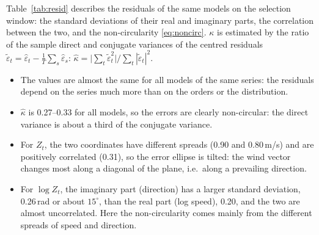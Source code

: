 \documentclass[11pt,a4paper]{article}
\begin{document}
Table~\ref{tab:resid} describes the residuals of the same models on the selection window: the
standard deviations of their real and imaginary parts, the correlation between the two, and the
non-circularity \eqref{eq:noncirc}. $\kappa$ is estimated by the ratio of the sample direct and
conjugate variances of the centred residuals
$\tilde\varepsilon_t = \hat\varepsilon_t - \frac1T\sum_s\hat\varepsilon_s$:
$\hat\kappa = \bigl|\sum_t\tilde\varepsilon_t^2\bigr| / \sum_t|\tilde\varepsilon_t|^2$.
\begin{itemize}
  \item The values are almost the same for all models of the same series: the residuals depend on
    the series much more than on the orders or the distribution.
  \item $\hat\kappa$ is 0.27--0.33 for all models, so the errors are clearly non-circular: the
    direct variance is about a third of the conjugate variance.
  \item For $Z_t$, the two coordinates have different spreads (0.90 and 0.80\,m/s) and are
    positively correlated (0.31), so the error ellipse is tilted: the wind vector changes most
    along a diagonal of the plane, i.e.\ along a prevailing direction.
  \item For $\log Z_t$, the imaginary part (direction) has a larger standard deviation, 0.26\,rad
    or about $15^\circ$, than the real part (log speed), 0.20, and the two are almost
    uncorrelated. Here the non-circularity comes mainly from the different spreads of speed and
    direction.
\end{itemize}
\end{document}
